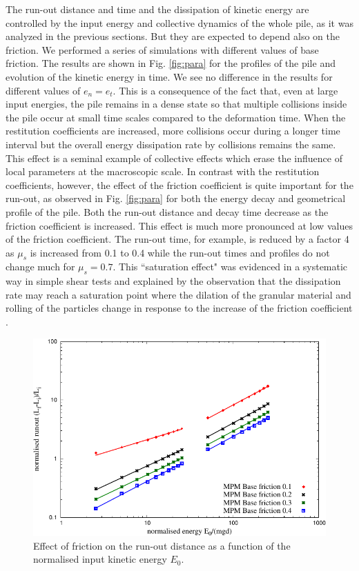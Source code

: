 The run-out distance and time and the dissipation of kinetic energy are 
controlled by the input energy and collective dynamics of the whole pile, as it 
was analyzed in the previous sections. But they are expected to depend also on 
the friction. We performed a series of simulations with different values of 
base friction. The results are shown in Fig. \ref{fig:para} for the profiles of 
the pile and evolution of the kinetic energy in time. We see no difference in 
the results for different values of $e_n = e_t$. This is a consequence of the 
fact that,  even at large input energies, the pile remains in a dense state so 
that multiple collisions inside the pile occur at small time scales compared to 
the deformation time. When the restitution coefficients are increased, more 
collisions occur during a longer time interval but the overall energy 
dissipation rate by collisions remains the same. This effect is a seminal 
example of collective effects which erase the influence of local parameters at 
the macroscopic scale. In contrast with the restitution coefficients, however, 
the effect of the friction coefficient is quite important for the run-out, as 
observed in Fig. \ref{fig:para} for both the energy decay and geometrical 
profile of the pile. Both the run-out distance and decay time decrease as the 
friction coefficient is increased. This effect is much more pronounced at low 
values of the friction coefficient. The run-out time, for example, is reduced 
by a factor 4 as $\mu_s$ is increased from 0.1 to 0.4 while the run-out times 
and profiles do not change much for $\mu_s = 0.7$. This ``saturation effect" 
was evidenced in a systematic way in simple shear tests and explained by the 
observation that the dissipation rate may reach a saturation point where the 
dilation of the granular material and rolling of the particles change in 
response to the increase of the friction coefficient \cite{Estrada2008}.

\begin{figure}[tbhp]
\centering
\includegraphics[width=\textwidth]{runout_fric_slope}
\caption{Effect of friction on the run-out distance as a function of the 
normalised input kinetic energy $E_{0}$.}
\label{fig:runout_fric_slope}
\end{figure}


